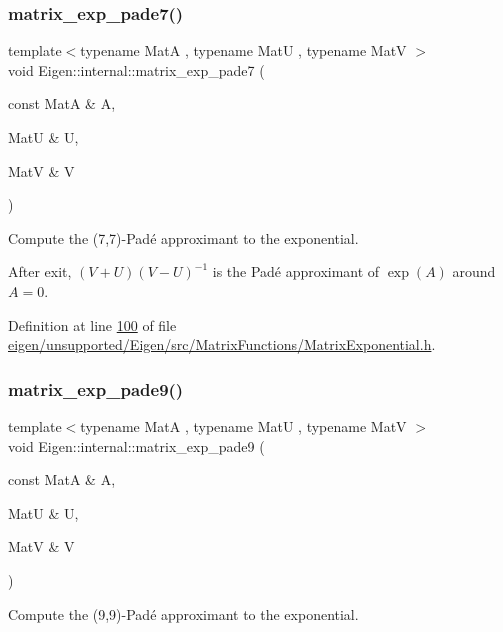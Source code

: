 \subsubsection{\texorpdfstring{matrix\+\_\+exp\+\_\+pade7()}{matrix\_exp\_pade7()}}
{\footnotesize\ttfamily template$<$typename MatA , typename MatU , typename MatV $>$ \\
void Eigen\+::internal\+::matrix\+\_\+exp\+\_\+pade7 (\begin{DoxyParamCaption}\item[{const MatA \&}]{A,  }\item[{MatU \&}]{U,  }\item[{MatV \&}]{V }\end{DoxyParamCaption})}



Compute the (7,7)-\/\+Pad\'{e} approximant to the exponential. 

After exit, $ (V+U)(V-U)^{-1} $ is the Pad\'{e} approximant of $ \exp(A) $ around $ A = 0 $. 

Definition at line \hyperlink{eigen_2unsupported_2_eigen_2src_2_matrix_functions_2_matrix_exponential_8h_source_l00100}{100} of file \hyperlink{eigen_2unsupported_2_eigen_2src_2_matrix_functions_2_matrix_exponential_8h_source}{eigen/unsupported/\+Eigen/src/\+Matrix\+Functions/\+Matrix\+Exponential.\+h}.

\mbox{\label{namespace_eigen_1_1internal_a218447e97bf869bf354f92e020a7355a}} 
\subsubsection{\texorpdfstring{matrix\+\_\+exp\+\_\+pade9()}{matrix\_exp\_pade9()}}
{\footnotesize\ttfamily template$<$typename MatA , typename MatU , typename MatV $>$ \\
void Eigen\+::internal\+::matrix\+\_\+exp\+\_\+pade9 (\begin{DoxyParamCaption}\item[{const MatA \&}]{A,  }\item[{MatU \&}]{U,  }\item[{MatV \&}]{V }\end{DoxyParamCaption})}



Compute the (9,9)-\/\+Pad\'{e} approximant to the exponential. 

